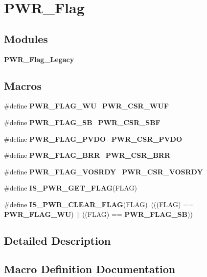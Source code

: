 \section{P\+W\+R\+\_\+\+Flag}
\label{group__PWR__Flag}
\subsection*{Modules}
\begin{DoxyCompactItemize}
\item 
\textbf{ P\+W\+R\+\_\+\+Flag\+\_\+\+Legacy}
\end{DoxyCompactItemize}
\subsection*{Macros}
\begin{DoxyCompactItemize}
\item 
\#define \textbf{ P\+W\+R\+\_\+\+F\+L\+A\+G\+\_\+\+WU}~\textbf{ P\+W\+R\+\_\+\+C\+S\+R\+\_\+\+W\+UF}
\item 
\#define \textbf{ P\+W\+R\+\_\+\+F\+L\+A\+G\+\_\+\+SB}~\textbf{ P\+W\+R\+\_\+\+C\+S\+R\+\_\+\+S\+BF}
\item 
\#define \textbf{ P\+W\+R\+\_\+\+F\+L\+A\+G\+\_\+\+P\+V\+DO}~\textbf{ P\+W\+R\+\_\+\+C\+S\+R\+\_\+\+P\+V\+DO}
\item 
\#define \textbf{ P\+W\+R\+\_\+\+F\+L\+A\+G\+\_\+\+B\+RR}~\textbf{ P\+W\+R\+\_\+\+C\+S\+R\+\_\+\+B\+RR}
\item 
\#define \textbf{ P\+W\+R\+\_\+\+F\+L\+A\+G\+\_\+\+V\+O\+S\+R\+DY}~\textbf{ P\+W\+R\+\_\+\+C\+S\+R\+\_\+\+V\+O\+S\+R\+DY}
\item 
\#define \textbf{ I\+S\+\_\+\+P\+W\+R\+\_\+\+G\+E\+T\+\_\+\+F\+L\+AG}(F\+L\+AG)
\item 
\#define \textbf{ I\+S\+\_\+\+P\+W\+R\+\_\+\+C\+L\+E\+A\+R\+\_\+\+F\+L\+AG}(F\+L\+AG)~(((F\+L\+AG) == \textbf{ P\+W\+R\+\_\+\+F\+L\+A\+G\+\_\+\+WU}) $\vert$$\vert$ ((F\+L\+AG) == \textbf{ P\+W\+R\+\_\+\+F\+L\+A\+G\+\_\+\+SB}))
\end{DoxyCompactItemize}


\subsection{Detailed Description}


\subsection{Macro Definition Documentation}
\mbox{\label{group__PWR__Flag_ga36d35a770e683e4a0baf3aac350fcb5a}} 
